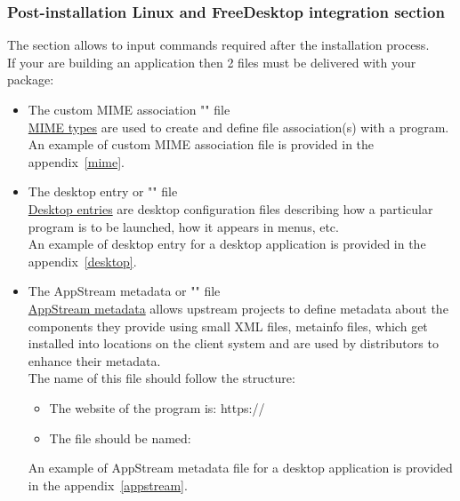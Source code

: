 \clearpage
\subsubsection{Post-installation Linux and FreeDesktop integration section}
\label{rpmpost}

The  section allows to input commands required after the installation process. \\
If your are building an application then 2 files must be delivered with your package:
\begin{itemize}
\item The custom MIME association "" file \\[0.25cm]
\href{https://help.gnome.org/admin/system-admin-guide/stable/mime-types.html.en}{MIME types} are used to create and define file association(s) with a program. \\ 
An example of custom MIME association file is provided in the appendix~\ref{mime}.
\item The desktop entry or "" file \\[0.25cm]
\href{https://specifications.freedesktop.org/desktop-entry-spec/latest/}{Desktop entries} are desktop configuration files describing 
how a particular program is to be launched, how it appears in menus, etc. \\
An example of desktop entry for a desktop application is provided in the appendix~\ref{desktop}.
\item The AppStream metadata or "" file \\[0.25cm]
\href{https://www.freedesktop.org/software/appstream/docs/}{AppStream metadata} allows upstream projects to define metadata 
about the components they provide using small XML files, metainfo files, which get installed into locations on the client system 
and are used by distributors to enhance their metadata. \\ 
The name of this file should follow the structure:
\vspace{-0.125cm}
\begin{center}\end{center}
\vspace{-0.25cm}
\begin{itemize}
\item The website of the program is: \quad https://
\item The file should be named: \quad\qquad {}
\end{itemize}
An example of AppStream metadata file for a desktop application is provided in the appendix~\ref{appstream}.
\end{itemize}
